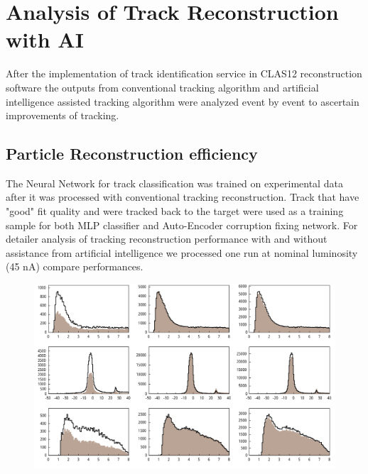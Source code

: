 \section{Analysis of Track Reconstruction with AI}

After the implementation of track identification service in CLAS12 reconstruction software the outputs
from conventional tracking algorithm and artificial intelligence assisted tracking algorithm were analyzed
event by event to ascertain improvements of tracking. 
 
 \subsection{Particle Reconstruction efficiency}
 
 The Neural Network for track classification was trained on experimental data after it was processed with conventional tracking 
 reconstruction. Track that have "good" fit quality and were tracked back to the target were used as a training sample for both 
 MLP classifier and Auto-Encoder corruption fixing network. For detailer analysis of tracking reconstruction performance with and without 
 assistance from artificial intelligence we processed one run at nominal luminosity (45 nA) compare performances.
 
 \begin{figure}[!h]
\begin{center}
  \includegraphics[width=5.0in]{images/summary_5SL_6SL_neg.pdf}
\caption { }
 \label{track:efficiency}
 \end{center}
\end{figure}

